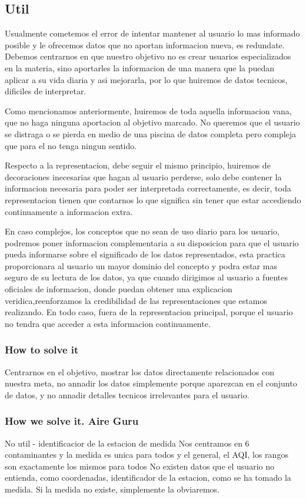 \subsection{Util}
Usualmente cometemos el error de intentar mantener al usuario lo mas informado posible y le ofrecemos datos que
no aportan informacion nueva, es redundate.
Debemos centrarnos en que nuestro objetivo no es crear usuarios especializados en la materia, sino aportarles la
informacion de una manera que la puedan aplicar a su vida diaria y asi mejorarla, por lo que huiremos de datos
tecnicos, dificiles de interpretar.

Como mencionamos anteriormente, huiremos de toda aquella informacion vana, que no haga ninguna aportacion
al objetivo marcado. No queremos que el usuario se distraga o se pierda en medio de una piscina de datos completa
pero compleja que para el no tenga ningun sentido. 

Respecto a la representacion, debe seguir el mismo principio, huiremos de decoraciones inecesarias que hagan al 
usuario perderse, solo debe contener la informacion necesaria para poder ser interpretada correctamente, es decir,
toda representacion tienen que contarnos lo que significa sin tener que estar accediendo continuamente a informacion
extra.

En caso complejos, los conceptos que no sean de uso diario para los usuario, podremos poner informacion
complementaria a su disposicion para que el usuario pueda informarse sobre el significado de los datos 
representados, esta practica proporcionara al usuario un mayor dominio del concepto y podra estar mas
seguro de su lectura de los datos, ya que cuando dirigimos al usuario a fuentes oficiales de informacion, donde puedan 
obtener una explicacion veridica,reenforzamos la credibilidad de las representaciones que estamos realizando. En todo caso, 
fuera de la representacion principal, porque el usuario no tendra que acceder a esta informacion continuamente.

\subsubsection{How to solve it} 
Centrarnos en el objetivo, mostrar los datos directamente relacionados con nuestra meta, no annadir los datos 
simplemente porque aparezcan en el conjunto de datos, y no annadir detalles tecnicos irrelevantes para el usuario.


\subsubsection{How we solve it. Aire Guru} 
No util - identificacior de la estacion de medida
 Nos centramos en 6 contaminantes y la medida es unica para todos y el general, el AQI, los rangos son exactamente
 los mismos para todos
 No existen datos que el usuario no entienda, como coordenadas, identificador de la estacion, como se ha tomado la medida.
 Si la medida no existe, simplemente la obviaremos.

